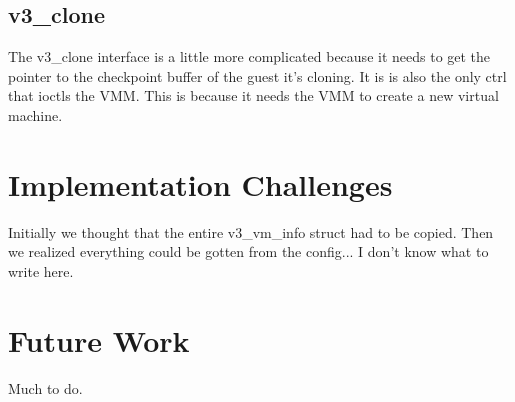 \documentclass{acm_proc_article-sp}
\begin{document}
\subsection{v3\_clone}
The v3\_clone interface is a little more complicated because it needs to get the pointer to the checkpoint buffer
of the guest it's cloning. It is is also the only ctrl that ioctls the VMM. This is because it needs the VMM to create a new
virtual machine. 

\section{Implementation Challenges}
Initially we thought that the entire v3\_vm\_info struct had to be copied. Then we realized everything could
be gotten from the config... I don't know what to write here.

\section{Future Work}
\label{sec:future}
Much to do.



\end{document}
